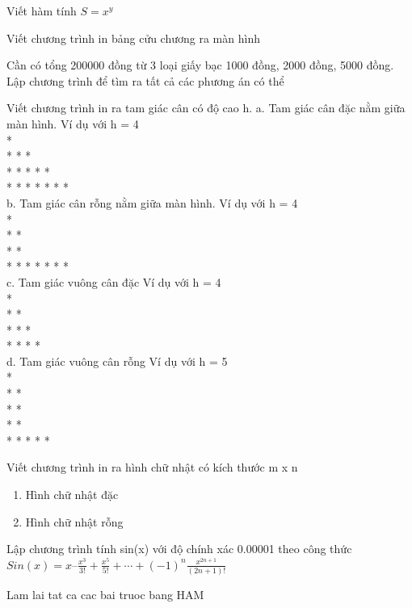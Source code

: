 \begin{problem}
    Viết hàm tính $S = x^y$
\end{problem}
\begin{problem}
    Viết chương trình in bảng cửu chương ra màn hình
\end{problem}
\begin{problem}
    Cần có tổng 200000 đồng từ 3 loại giấy bạc 1000 đồng, 2000 đồng, 5000 đồng. Lập chương trình để tìm ra tất cả các phương án có thể
\end{problem}
\begin{problem}
Viết chương trình in ra tam giác cân có độ cao h.
a. Tam giác cân đặc nằm giữa màn hình.
Ví dụ với h = 4\\
            *\\
          * * *\\
        * * * * *\\
      * * * * * * *\\
b. Tam giác cân rỗng nằm giữa màn hình.
Ví dụ với h = 4\\
*\\
* *\\
* *\\
* * * * * * *\\
c. Tam giác vuông cân đặc
Ví dụ với h = 4\\
*\\
* *\\
* * *\\
* * * *\\
d. Tam giác vuông cân rỗng
Ví dụ với h = 5\\
*\\
* *\\
* *\\
* *\\
* * * * *\\

\end{problem}
\begin{problem}
    Viết chương trình in ra hình chữ nhật có kích thước m x n\\
    \begin{enumerate}
        \item Hình chữ nhật đặc
        \item Hình chữ nhật rỗng
    \end{enumerate}
\end{problem}
\begin{problem}
    Lập chương trình tính sin(x) với độ chính xác 0.00001 theo công thức
 $Sin(x) = x – \frac{x^3}{3!} + \frac{x^5}{5!} + \cdots + (-1)^n \frac{x^{2n + 1}}{(2n + 1)!}$
\end{problem}
\begin{problem}
    Lam lai tat ca cac bai truoc bang HAM
\end{problem}


